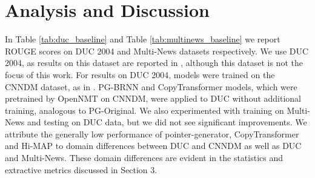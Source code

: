 \documentclass[11pt,a4paper]{article}
\begin{document}
\begin{table}[h!]
\centering
\small
{}
\caption{ROUGE scores for models trained and tested on the Multi-News dataset.}
\label{tab:multinews_baseline}
\end{table}




\vspace{-2mm}
\section{Analysis and Discussion}


In Table \ref{tab:duc_baseline} and Table \ref{tab:multinews_baseline} we report ROUGE scores on DUC 2004 and Multi-News datasets respectively.
We use DUC 2004, as results on this dataset are reported in , although this dataset is not the focus of this work. For results on DUC 2004, models were trained on the CNNDM dataset, as in . PG-BRNN and CopyTransformer models, which were pretrained by OpenNMT on CNNDM, were applied to DUC without additional training, analogous to PG-Original. We also experimented with training on Multi-News and testing on DUC data, but we did not see significant improvements. We attribute the generally low performance of pointer-generator, CopyTransformer and Hi-MAP to domain differences between DUC and CNNDM as well as DUC and Multi-News. These domain differences are evident in the statistics and extractive metrics discussed in Section 3. 
\end{document}
